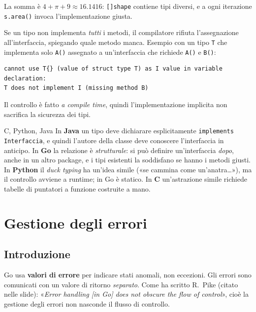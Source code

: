 \documentclass[11pt,a4paper]{report}
\newcommand{\cod}[1]{\texttt{#1}}
\begin{document}
La somma è $4+\pi+9\approx16.1416$: \cod{[]shape} contiene tipi diversi, e a
ogni iterazione \cod{s.area()} invoca l'implementazione giusta.

\begin{attenzione}
Se un tipo non implementa \emph{tutti} i metodi, il compilatore rifiuta
l'assegnazione all'interfaccia, spiegando quale metodo manca. Esempio con un
tipo \cod{T} che implementa solo \cod{A()} assegnato a un'interfaccia che richiede
\cod{A()} e \cod{B()}:
\begin{lstlisting}[style=output,aboveskip=0.3em,belowskip=0.3em]
cannot use T{} (value of struct type T) as I value in variable declaration:
T does not implement I (missing method B)
\end{lstlisting}
Il controllo è fatto \emph{a compile time}, quindi l'implementazione implicita
non sacrifica la sicurezza dei tipi.
\end{attenzione}

\begin{confronto}{C, Python, Java}
In \textbf{Java} un tipo deve dichiarare esplicitamente \cod{implements
Interfaccia}, e quindi l'autore della classe deve conoscere l'interfaccia in
anticipo. In \textbf{Go} la relazione è \emph{strutturale}: si può definire
un'interfaccia \emph{dopo}, anche in un altro package, e i tipi esistenti la
soddisfano se hanno i metodi giusti. In \textbf{Python} il \emph{duck typing}
ha un'idea simile («se cammina come un'anatra\ldots»), ma il controllo avviene a
runtime; in Go è statico. In \textbf{C} un'astrazione simile richiede tabelle
di puntatori a funzione costruite a mano.
\end{confronto}

\section{Gestione degli errori}\label{sec:errori}

\subsection{Introduzione}

Go usa \textbf{valori di errore} per indicare stati anomali, non eccezioni. Gli
errori sono comunicati con un valore di ritorno \emph{separato}. Come ha scritto
R.~Pike (citato nelle slide): «\emph{Error handling [in Go] does not obscure the
flow of control}», cioè la gestione degli errori non nasconde il flusso di
controllo.
\end{document}
